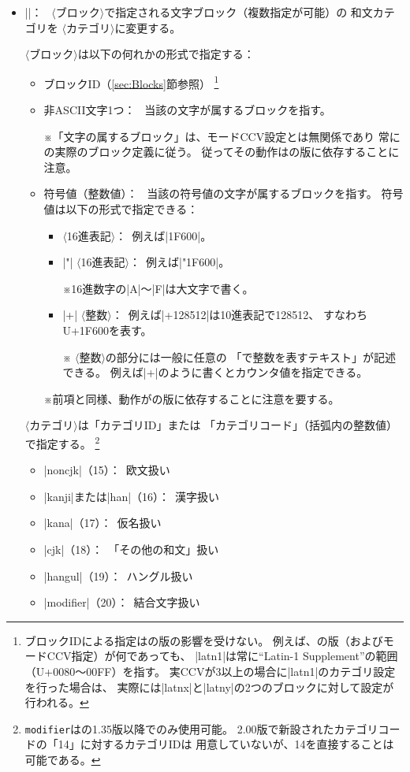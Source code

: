 \documentclass[uplatex,dvipdfmx,a4paper]{jsarticle}
\newcommand{\Meta}[1]{%
  $\langle$\mbox{}\nolinebreak#1\nolinebreak\mbox{}$\rangle$}
\newcommand{\Note}{\par\noindent ※}
\newcommand{\Means}{：~}
\begin{document}
\begin{itemize}
\item |\cjkcategory{|\Meta{ブロック}|,...}{|\Meta{カテゴリ}|}|\Means
  \Meta{ブロック}で指定される文字ブロック（複数指定が可能）の
  和文カテゴリを\Meta{カテゴリ}に変更する。

  \Meta{ブロック}は以下の何れかの形式で指定する：
  \begin{itemize}
  \item ブロックID（\ref{sec:Blocks}節参照）%
    \footnote{ブロックIDによる指定は{\upTeX}の版の影響を受けない。
      例えば、{\upTeX}の版（およびモードCCV指定）が何であっても、
      |latn1|は常に“Latin-1 Supplement”の範囲（U+0080～00FF）を指す。
      実CCVが3以上の場合に|latn1|のカテゴリ設定を行った場合は、
      実際には|latnx|と|latny|の2つのブロックに対して設定が行われる。}
  \item 非ASCII文字1つ\Means
    当該の文字が属するブロックを指す。
    \Note 「文字の属するブロック」は、モードCCV設定とは無関係であり
    常に{\upTeX}の実際のブロック定義に従う。
    従ってその動作は{\upTeX}の版に依存することに注意。
  \item 符号値（整数値）\Means
    当該の符号値の文字が属するブロックを指す。
    符号値は以下の形式で指定できる\Means
    \begin{itemize}
    \item \Meta{16進表記}\Means 例えば|1F600|。
    \item |"|\Meta{16進表記}\Means 例えば|"1F600|。
      \Note 16進数字の|A|～|F|は大文字で書く。
    \item |+|\Meta{整数}\Means 例えば|+128512|は10進表記で128512、
      すなわちU+1F600を表す。
      \Note \Meta{整数}の部分には一般に任意の
      「{\LaTeXTeX}で整数を表すテキスト」が記述できる。
      例えば|+\value{mycode}|のように書くとカウンタ値を指定できる。
    \end{itemize}
    \Note 前項と同様、動作が{\upTeX}の版に依存することに注意を要する。
  \end{itemize}
  \Meta{カテゴリ}は「カテゴリID」または
  「カテゴリコード」（括弧内の整数値）で指定する。
  \footnote{\texttt{modifier}は{\upTeX}の1.35版以降でのみ使用可能。
    2.00版で新設されたカテゴリコードの「14」に対するカテゴリIDは
    用意していないが、14を直接することは可能である。}
  \begin{itemize}
  \item |noncjk|（15）\Means 欧文扱い
  \item |kanji|または|han|（16）\Means 漢字扱い
  \item |kana|（17）\Means 仮名扱い
  \item |cjk|（18）\Means \<「その他の和文」扱い
  \item |hangul|（19）\Means ハングル扱い
  \item |modifier|（20）\Means 結合文字扱い
  \end{itemize}


\end{itemize}
\end{document}
